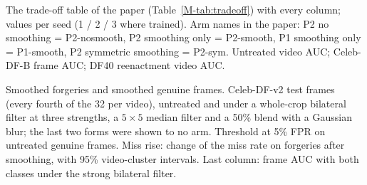 \documentclass[10pt]{article}
\begin{document}
\begin{table}
\centering
\caption{The trade-off table of the paper (Table~\ref{M-tab:tradeoff}) with every column; values per seed (1 / 2 / 3 where trained).
Arm names in the paper: P2 no smoothing = P2-nosmooth, P2 smoothing only = P2-smooth, P1 smoothing only = P1-smooth, P2 symmetric
smoothing = P2-sym. Untreated video AUC; Celeb-DF-B frame AUC; DF40 reenactment video AUC.}
\label{tab:tradeofffull}
\scriptsize
\begin{adjustbox}{max width=\linewidth}\end{adjustbox}
\end{table}

\begin{table}
\centering
\caption{Smoothed forgeries and smoothed genuine frames. Celeb-DF-v2 test frames (every fourth of the 32 per video), untreated and
under a whole-crop bilateral filter at three strengths, a $5\times5$ median filter and a 50\% blend with a Gaussian blur; the last
two forms were shown to no arm. Threshold at 5\% FPR on untreated genuine frames. Miss rise: change of the miss rate on forgeries
after smoothing, with 95\% video-cluster intervals. Last column: frame AUC with both classes under the strong bilateral filter.}
\label{tab:v4evasion}
\scriptsize
\begin{adjustbox}{max width=\linewidth}\end{adjustbox}
\end{table}
\end{document}
